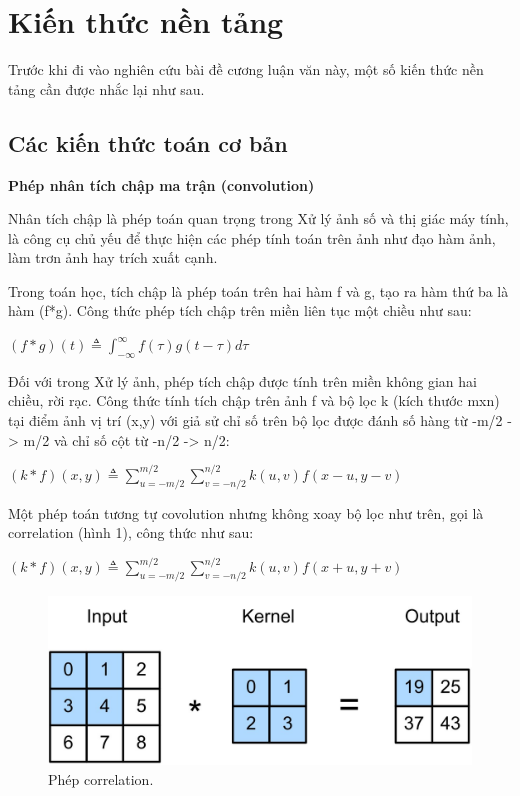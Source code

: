 \section{Kiến thức nền tảng}
Trước khi đi vào nghiên cứu bài đề cương luận văn này, một số kiến thức nền tảng cần được nhắc lại như sau.
\subsection{Các kiến thức toán cơ bản}
\textbf{Phép nhân tích chập ma trận (convolution)}

Nhân tích chập là phép toán quan trọng trong Xử lý ảnh số và thị giác máy tính, là công cụ chủ yếu để thực hiện
các phép tính toán trên ảnh như đạo hàm ảnh, làm trơn ảnh hay trích xuất cạnh.

Trong toán học, tích chập là phép toán trên hai hàm f và g, tạo ra hàm thứ ba là hàm (f*g). Công thức phép tích
chập trên miền liên tục một chiều như sau:

$(f*g)(t) \triangleq \displaystyle \int_{-\infty}^{\infty}f(\tau)g(t-\tau)d\tau$


Đối với trong Xử  lý ảnh, phép tích chập được tính trên miền không gian hai chiều, rời rạc. Công thức tính tích
chập trên ảnh f và bộ lọc k (kích thước mxn) tại điểm ảnh vị trí (x,y) với giả sử chỉ số trên bộ lọc được đánh số hàng từ -m/2 -> m/2
và chỉ số cột từ -n/2 -> n/2:

$(k*f)(x,y) \triangleq \displaystyle \sum_{u=-m/2}^{m/2}\displaystyle \sum_{v=-n/2}^{n/2}k(u,v)f(x-u,y-v)$

Một phép toán tương tự covolution nhưng không xoay bộ lọc như trên, gọi là correlation (hình 1), công thức như sau:

$(k*f)(x,y) \triangleq \displaystyle \sum_{u=-m/2}^{m/2}\displaystyle \sum_{v=-n/2}^{n/2}k(u,v)f(x+u,y+v)$
\begin{figure}[!h]
    \begin{center}
        \includegraphics[width=\linewidth]{asset/image/correlation.jpg}
        \caption{Phép correlation.}
    \end{center}
\end{figure}


